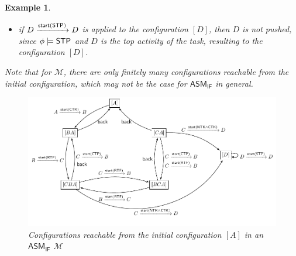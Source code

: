 \documentclass[preprint,12pt]{elsarticle}
\newtheorem{example}{Example}
\newcommand\Mm{{\mathcal{M} }}
\newcommand\stpflag{{\sf STP}}
\newcommand{\IFAMASS}{\textsf{ASM}_\textsf{IF}}
\newcommand\startactivity{{\mathsf{start} }}
\newcommand{\STD}{\mathsf{STD}}
\begin{document}
\begin{example}
\begin{itemize}
		\item if $D \xrightarrow{\startactivity(\stpflag)} D$ is applied to the configuration $[D]$, then $D$ is not pushed, since $\phi\models\stpflag$ and $D$ is the top activity of the task, resulting to the configuration $[D]$.
	\end{itemize}
	Note that for $\Mm$, there are only finitely many configurations reachable from the initial configuration, which may not be the case for $\IFAMASS$ in general.  
	
	
	
	\begin{figure}
		\centering
		\includegraphics[scale = 0.8]{ifasm-example.pdf}
		\caption{Configurations reachable from the initial configuration $[A]$ in an $\IFAMASS$ $\Mm$}
		\label{ifasm-example}
	\end{figure}
\end{example}
\end{document}
